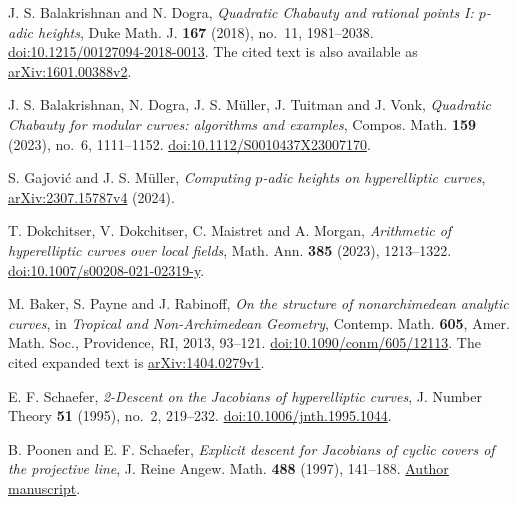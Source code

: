 J. S. Balakrishnan and N. Dogra,
\emph{Quadratic Chabauty and rational points I: $p$-adic heights},
Duke Math. J. \textbf{167} (2018), no.~11, 1981--2038.
\href{https://doi.org/10.1215/00127094-2018-0013}{doi:10.1215/00127094-2018-0013}.
The cited text is also available as
\href{https://arxiv.org/abs/1601.00388v2}{arXiv:1601.00388v2}.

J. S. Balakrishnan, N. Dogra, J. S. M\"uller, J. Tuitman and J. Vonk,
\emph{Quadratic Chabauty for modular curves: algorithms and examples},
Compos. Math. \textbf{159} (2023), no.~6, 1111--1152.
\href{https://doi.org/10.1112/S0010437X23007170}{doi:10.1112/S0010437X23007170}.

S. Gajovi\'c and J. S. M\"uller,
\emph{Computing $p$-adic heights on hyperelliptic curves},
\href{https://arxiv.org/abs/2307.15787v4}{arXiv:2307.15787v4} (2024).

T. Dokchitser, V. Dokchitser, C. Maistret and A. Morgan,
\emph{Arithmetic of hyperelliptic curves over local fields},
Math. Ann. \textbf{385} (2023), 1213--1322.
\href{https://doi.org/10.1007/s00208-021-02319-y}{doi:10.1007/s00208-021-02319-y}.

M. Baker, S. Payne and J. Rabinoff,
\emph{On the structure of nonarchimedean analytic curves},
in \emph{Tropical and Non-Archimedean Geometry},
Contemp. Math. \textbf{605}, Amer. Math. Soc., Providence, RI, 2013,
93--121. \href{https://doi.org/10.1090/conm/605/12113}{doi:10.1090/conm/605/12113}.
The cited expanded text is
\href{https://arxiv.org/abs/1404.0279v1}{arXiv:1404.0279v1}.

E. F. Schaefer,
\emph{2-Descent on the Jacobians of hyperelliptic curves},
J. Number Theory \textbf{51} (1995), no.~2, 219--232.
\href{https://doi.org/10.1006/jnth.1995.1044}{doi:10.1006/jnth.1995.1044}.

B. Poonen and E. F. Schaefer,
\emph{Explicit descent for Jacobians of cyclic covers of the projective line},
J. Reine Angew. Math. \textbf{488} (1997), 141--188.
\href{https://math.mit.edu/~poonen/papers/descent.pdf}{Author manuscript}.
